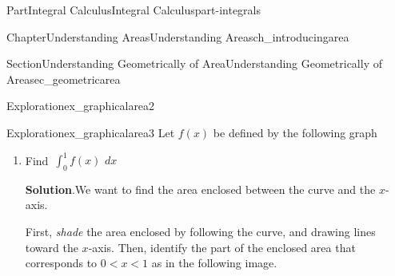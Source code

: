 \documentclass[oneside,10pt,]{tufte-book}
\newcommand{\blocktitlefont}{\relax}
\numberwithin{equation}{chapter}
\newcommand{\intdx}[1]{{\,\int#1\,\,dx}}
\newcommand{\lt}{<}
\begin{document}
\begin{partptx}{Part}{Integral Calculus}{}{Integral Calculus}{}{}{part-integrals}
\begin{chapterptx}{Chapter}{Understanding Areas}{}{Understanding Areas}{}{}{ch_introducingarea}
\begin{sectionptx}{Section}{Understanding Geometrically of Area}{}{Understanding Geometrically of Area}{}{}{sec_geometricarea}
\begin{exploration}{Exploration}{}{ex_graphicalarea2}
\begin{enumerate}[font=\bfseries,label=(\alph*),ref=\alph*]
%
\end{enumerate}%
\end{exploration}%
\begin{exploration}{Exploration}{}{ex_graphicalarea3}%
Let \(f(x)\) be defined by the following graph%
\begin{image}{0.25}{0.5}{0.25}{}%
%
\end{image}%
\begin{enumerate}[font=\bfseries,label=(\alph*),ref=\alph*]%
\item{}Find \(\intdx{_0^1 f(x) }\)%
\par\smallskip%
\noindent\textbf{\blocktitlefont Solution}.\hypertarget{ex_graphicalarea3-2-2}{}\quad{}We want to find the area enclosed between the curve and the \(x\)-axis.%
\par
First, \emph{shade} the area enclosed by following the curve, and drawing lines toward the \(x\)-axis. Then, identify the part of the enclosed area that corresponds to \(0\lt x \lt 1\) as in the following image.%
\begin{image}{0.25}{0.5}{0.25}{}%
\end{image}
\end{enumerate}
\end{exploration}
\end{sectionptx}
\end{chapterptx}
\end{partptx}
\end{document}
